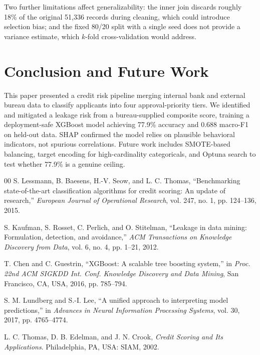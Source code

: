\documentclass[conference]{IEEEtran}
\begin{document}
Two further limitations affect generalizability: the inner join discards roughly 18\% of the original 51{,}336 records during cleaning, which could introduce selection bias; and the fixed 80/20 split with a single seed does not provide a variance estimate, which $k$-fold cross-validation would address.

\section{Conclusion and Future Work}

This paper presented a credit risk pipeline merging internal bank and external bureau data to classify applicants into four approval-priority tiers. We identified and mitigated a leakage risk from a bureau-supplied composite score, training a deployment-safe XGBoost model achieving 77.9\% accuracy and 0.688 macro-F1 on held-out data. SHAP confirmed the model relies on plausible behavioral indicators, not spurious correlations. Future work includes SMOTE-based balancing, target encoding for high-cardinality categoricals, and Optuna search to test whether 77.9\% is a genuine ceiling.

\clearpage
\begin{thebibliography}{00}
 S. Lessmann, B. Baesens, H.-V. Seow, and L. C. Thomas, ``Benchmarking state-of-the-art classification algorithms for credit scoring: An update of research,'' \textit{European Journal of Operational Research}, vol. 247, no. 1, pp. 124--136, 2015.

 S. Kaufman, S. Rosset, C. Perlich, and O. Stitelman, ``Leakage in data mining: Formulation, detection, and avoidance,'' \textit{ACM Transactions on Knowledge Discovery from Data}, vol. 6, no. 4, pp. 1--21, 2012.

 T. Chen and C. Guestrin, ``XGBoost: A scalable tree boosting system,'' in \textit{Proc. 22nd ACM SIGKDD Int. Conf. Knowledge Discovery and Data Mining}, San Francisco, CA, USA, 2016, pp. 785--794.

 S. M. Lundberg and S.-I. Lee, ``A unified approach to interpreting model predictions,'' in \textit{Advances in Neural Information Processing Systems}, vol. 30, 2017, pp. 4765--4774.

 L. C. Thomas, D. B. Edelman, and J. N. Crook, \textit{Credit Scoring and Its Applications}. Philadelphia, PA, USA: SIAM, 2002.
\end{thebibliography}
\end{document}
